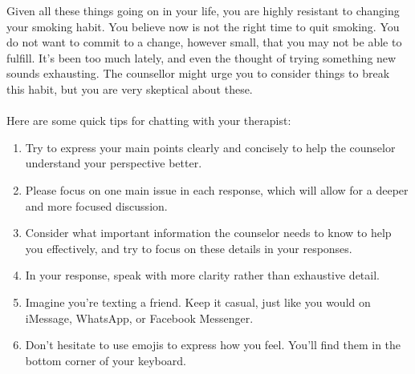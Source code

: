 \begin{tcolorbox}
	Given all these things going on in your life, you are highly resistant to changing your smoking habit. You believe now is not the right time to quit smoking. You do not want to commit to a change, however small, that you may not be able to fulfill. It's been too much lately, and even the thought of trying something new sounds exhausting. The counsellor might urge you to consider things to break this habit, but you are very skeptical about these.\\\\

	\vspace{5pt}
	Here are some quick tips for chatting with your therapist:
	\begin{enumerate}[itemsep=0pt, parsep=0pt]
		\item Try to express your main points clearly and concisely to help the counselor understand your perspective better.
		\item Please focus on one main issue in each response, which will allow for a deeper and more focused discussion.
		\item Consider what important information the counselor needs to know to help you effectively, and try to focus on these details in your responses.
		\item In your response, speak with more clarity rather than exhaustive detail.
		\item Imagine you're texting a friend. Keep it casual, just like you would on iMessage, WhatsApp, or Facebook Messenger.
		\item Don't hesitate to use emojis to express how you feel. You'll find them in the bottom corner of your keyboard.
	\end{enumerate}



\end{tcolorbox}
